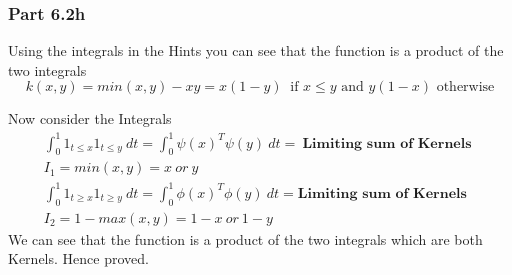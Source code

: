 \subsubsection{Part 6.2h}
Using the integrals in the Hints you can see that the function is a product of the two integrals
$$
    k(x,y) = min(x, y)  - xy = x(1 - y)  \ \text{ if } x \leq y \text{ and } y(1 - x) \text{ otherwise}
$$

Now consider the Integrals 
\begin{gather}
    \int_{0}^{1} 1_{t \le x} 1_{t \le y} \ dt  = \int_{0}^{1} \psi(x)^T \psi(y) \ dt  = \  \textbf{Limiting sum of Kernels }
    \\
    I_1 = min(x, y) = x  \ or \  y
    \\
    \int_{0}^{1} 1_{t \ge x} 1_{t \ge y} \ dt  = \int_{0}^{1} \phi(x)^T \phi(y) \ dt  = \textbf{Limiting sum of Kernels }
    \\
    I_2  = 1 - max(x, y) = 1 - x  \ or  \ 1 - y
\end{gather}
We can see that the function is a product of the two integrals which are both Kernels. Hence proved.

\newpage
